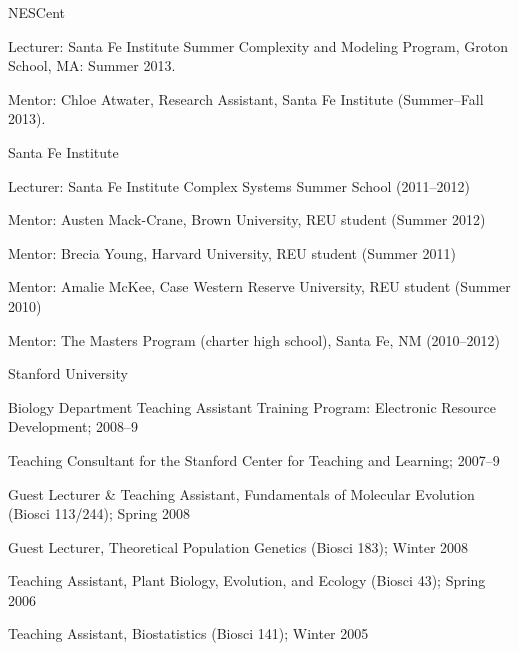\documentclass[centered,overlapped,line]{res}
\begin{document}
\begin{resume}
  \begin{compactitem}[]
  \item NESCent
    \begin{compactitem}[--]
    \item Lecturer: Santa Fe Institute Summer Complexity and Modeling Program, Groton School, MA: Summer 2013.
    \item Mentor: Chloe Atwater, Research Assistant, Santa Fe Institute (Summer--Fall 2013).
    \end{compactitem}
  \item Santa Fe Institute
    \begin{compactitem}[--]
    \item Lecturer: Santa Fe Institute Complex Systems Summer School (2011--2012)
    \item Mentor: Austen Mack-Crane, Brown University, REU student (Summer 2012)
    \item Mentor: Brecia Young, Harvard University, REU student (Summer 2011)
    \item Mentor: Amalie McKee, Case Western Reserve University, REU student (Summer 2010)
    \item Mentor: The Masters Program  (charter high school), Santa Fe, NM (2010--2012)
    \end{compactitem}
    \vspace{0.5ex}
  \item Stanford University
    \begin{compactitem}[--]
    \item Biology Department Teaching Assistant Training Program: Electronic Resource Development; 2008--9
    \item Teaching Consultant for the Stanford Center for Teaching and Learning; 2007--9
    \item Guest Lecturer \& Teaching Assistant, Fundamentals of Molecular Evolution (Biosci 113/244); Spring 2008
    \item Guest Lecturer, Theoretical Population Genetics (Biosci 183); Winter 2008
    \item Teaching Assistant, Plant Biology, Evolution, and Ecology (Biosci 43); Spring 2006
    \item Teaching Assistant, Biostatistics (Biosci 141); Winter 2005
    \end{compactitem}
  \end{compactitem}



\end{resume}
\end{document}
